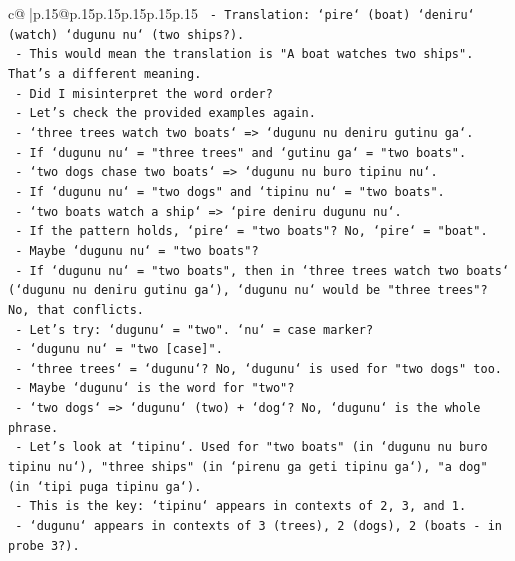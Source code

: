 \documentclass{article}
\begin{document}
{\begin{supertabular}{c@{$\;$}|p{.15\linewidth}@{}p{.15\linewidth}p{.15\linewidth}p{.15\linewidth}p{.15\linewidth}p{.15\linewidth}}
{{{\texttt{         {-} Translation: `pire` (boat) `deniru` (watch) `dugunu nu` (two ships?).} \\
\texttt{         {-} This would mean the translation is "A boat watches two ships". That's a different meaning.} \\
\texttt{         {-} Did I misinterpret the word order?} \\
\texttt{         {-} Let's check the provided examples again.} \\
\texttt{         {-} `three trees watch two boats` => `dugunu nu deniru gutinu ga`.} \\
\texttt{           {-} If `dugunu nu` = "three trees" and `gutinu ga` = "two boats".} \\
\texttt{         {-} `two dogs chase two boats` => `dugunu nu buro tipinu nu`.} \\
\texttt{           {-} If `dugunu nu` = "two dogs" and `tipinu nu` = "two boats".} \\
\texttt{         {-} `two boats watch a ship` => `pire deniru dugunu nu`.} \\
\texttt{           {-} If the pattern holds, `pire` = "two boats"? No, `pire` = "boat".} \\
\texttt{           {-} Maybe `dugunu nu` = "two boats"?} \\
\texttt{           {-} If `dugunu nu` = "two boats", then in `three trees watch two boats` (`dugunu nu deniru gutinu ga`), `dugunu nu` would be "three trees"? No, that conflicts.} \\
\texttt{           {-} Let's try: `dugunu` = "two". `nu` = case marker?} \\
\texttt{             {-} `dugunu nu` = "two {[}case{]}".} \\
\texttt{             {-} `three trees` = `dugunu`? No, `dugunu` is used for "two dogs" too.} \\
\texttt{             {-} Maybe `dugunu` is the word for "two"?} \\
\texttt{             {-} `two dogs` => `dugunu` (two) + `dog`? No, `dugunu` is the whole phrase.} \\
\texttt{             {-} Let's look at `tipinu`. Used for "two boats" (in `dugunu nu buro tipinu nu`), "three ships" (in `pirenu ga geti tipinu ga`), "a dog" (in `tipi puga tipinu ga`).} \\
\texttt{             {-} This is the key: `tipinu` appears in contexts of 2, 3, and 1.} \\
\texttt{             {-} `dugunu` appears in contexts of 3 (trees), 2 (dogs), 2 (boats {-} in probe 3?).} \\
}}}
\end{supertabular}}
\end{document}

